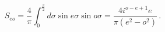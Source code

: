 \begin{equation}
S_{eo}={\frac{4}{\pi }}\int_{0}^{\frac{\pi }{2}}d\sigma \sin e\sigma \sin
o\sigma ={\frac{4i^{o-e+1}e}{\pi (e^{2}-o^{2})}}\,.  \label{S}
\end{equation}

